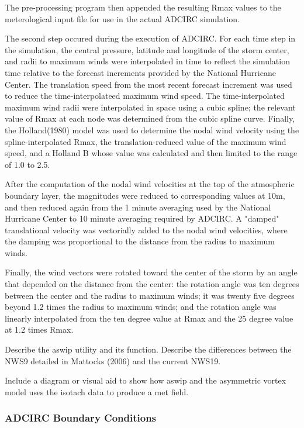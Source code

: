 \documentclass[12pt]{article}
\begin{document}
The pre-processing program then appended the resulting Rmax values 
to the meterological input file for use in the actual ADCIRC 
simulation.

The second step occured during the execution of ADCIRC. For each 
time step in the simulation, the central pressure, latitude and 
longitude of the storm center, and radii to maximum winds were 
interpolated in time to reflect the simulation time relative to the 
forecast increments provided by the National Hurricane Center. The 
translation speed from the most recent forecast increment was used 
to reduce the time-interpolateed maximum wind speed. The 
time-interpolated maximum wind radii were interpolated in space 
using a cubic spline; the relevant value of Rmax at each node was 
determined from the cubic spline curve. Finally, the Holland(1980) 
model was used to determine the nodal wind velocity using the 
spline-interpolated Rmax, the translation-reduced value of the 
maximum wind speed, and a Holland B whose value was calculated and 
then limited to the range of 1.0 to 2.5.

After the computation of the nodal wind velocities at the top of the 
atmospheric boundary layer, the magnitudes were reduced to 
corresponding values at 10m, and then reduced again from the 1 
minute averaging used by the National Hurricane Center to 10 minute 
averaging required by ADCIRC. A "damped" translational velocity was 
vectorially added to the nodal wind velocities, where the damping 
was proportional to the distance from the radius to maximum winds.

Finally, the wind vectors were rotated toward the center of the 
storm by an angle that depended on the distance from the center: the 
rotation angle was ten degrees between the center and the radius to 
maximum winds; it was twenty five degrees beyond 1.2 times the 
radius to maximum winds; and the rotation angle was linearly 
interpolated from the ten degree value at Rmax and the 25 degree 
value at 1.2 times Rmax.

Describe the aswip utility and its function. Describe the 
differences between the NWS9 detailed in Mattocks (2006) and the 
current NWS19. 

Include a diagram or visual aid to show how aswip and the asymmetric 
vortex model uses the isotach data to produce a met field. 

\subsubsection{ADCIRC Boundary Conditions}
\end{document}
